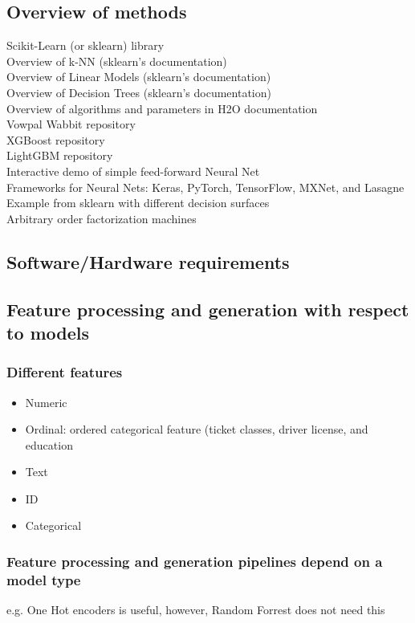 \documentclass[11pt, twoside]{article}   	%
\begin{document}
\subsection{Overview of methods}
\textup{}Scikit-Learn (or sklearn) library
\\Overview of k-NN (sklearn's documentation)
\\Overview of Linear Models (sklearn's documentation)
\\Overview of Decision Trees (sklearn's documentation)
\\Overview of algorithms and parameters in H2O documentation
\\Vowpal Wabbit repository
\\XGBoost repository
\\LightGBM repository
\\Interactive demo of simple feed-forward Neural Net
\\Frameworks for Neural Nets: Keras, PyTorch, TensorFlow, MXNet, and Lasagne
\\Example from sklearn with different decision surfaces
\\Arbitrary order factorization machines

\subsection{Software/Hardware requirements}


\subsection{Feature processing and generation with respect to models}
\subsubsection{Different features}
\begin{itemize}
  \item Numeric
  \item Ordinal: ordered categorical feature (ticket classes, driver license, and education
  \item Text
  \item ID 
  \item Categorical
\end{itemize}
\subsubsection{Feature processing and generation pipelines depend on a model type}
\textup{e.g. One Hot encoders is useful, however, Random Forrest does not need this}
\end{document}
